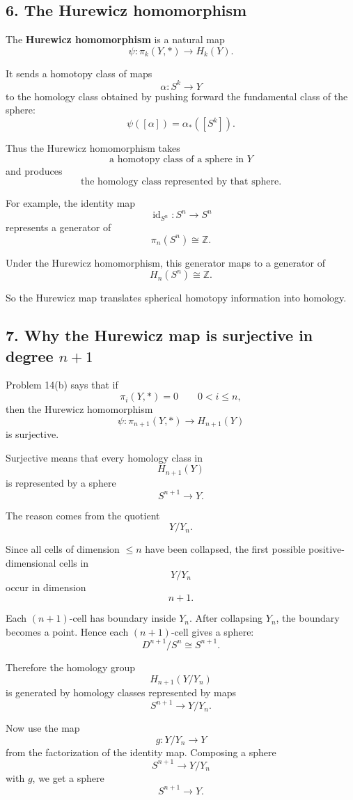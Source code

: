 \documentclass[12pt,a4paper]{article}
\theoremstyle{notespace}
\begin{document}
\subsection*{6. The Hurewicz homomorphism}

The \textbf{Hurewicz homomorphism} is a natural map
\[
\psi:\pi_k(Y,*)\to H_k(Y).
\]

It sends a homotopy class of maps
\[
\alpha:S^k\to Y
\]
to the homology class obtained by pushing forward the fundamental class of the sphere:
\[
\psi([\alpha])=\alpha_*([S^k]).
\]

Thus the Hurewicz homomorphism takes
\[
\text{a homotopy class of a sphere in \(Y\)}
\]
and produces
\[
\text{the homology class represented by that sphere}.
\]

For example, the identity map
\[
\operatorname{id}_{S^n}:S^n\to S^n
\]
represents a generator of
\[
\pi_n(S^n)\cong \mathbb Z.
\]

Under the Hurewicz homomorphism, this generator maps to a generator of
\[
H_n(S^n)\cong \mathbb Z.
\]

So the Hurewicz map translates spherical homotopy information into homology.

\subsection*{7. Why the Hurewicz map is surjective in degree \(n+1\)}

Problem 14(b) says that if
\[
\pi_i(Y,*)=0
\qquad
0<i\leq n,
\]
then the Hurewicz homomorphism
\[
\psi:\pi_{n+1}(Y,*)\to H_{n+1}(Y)
\]
is surjective.

Surjective means that every homology class in
\[
H_{n+1}(Y)
\]
is represented by a sphere
\[
S^{n+1}\to Y.
\]

The reason comes from the quotient
\[
Y/Y_n.
\]

Since all cells of dimension \(\leq n\) have been collapsed, the first possible positive-dimensional cells in
\[
Y/Y_n
\]
occur in dimension
\[
n+1.
\]

Each \((n+1)\)-cell has boundary inside \(Y_n\). After collapsing \(Y_n\), the boundary becomes a point. Hence each \((n+1)\)-cell gives a sphere:
\[
D^{n+1}/S^n\cong S^{n+1}.
\]

Therefore the homology group
\[
H_{n+1}(Y/Y_n)
\]
is generated by homology classes represented by maps
\[
S^{n+1}\to Y/Y_n.
\]

Now use the map
\[
g:Y/Y_n\to Y
\]
from the factorization of the identity map. Composing a sphere
\[
S^{n+1}\to Y/Y_n
\]
with \(g\), we get a sphere
\[
S^{n+1}\to Y.
\]
\end{document}
